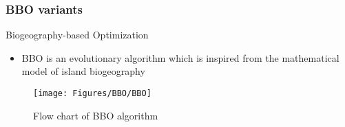 \documentclass [9pt,times] {beamer}
\begin{document}
\subsubsection{BBO variants}
\begin{frame}[fragile]{Biogeography-based Optimization}
\begin{itemize}
\item BBO \cite{simon2008} is an evolutionary algorithm which is inspired from the mathematical model of island biogeography

\end{itemize}
\begin{figure}
		\centering
		\texttt{[image: Figures/BBO/BBO]}
		\caption{Flow chart of BBO algorithm}
		\label{fig:flowchart}
\end{figure}

\end{frame}
\end{document}

